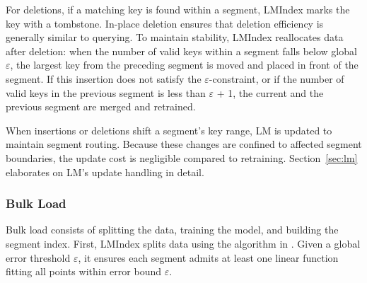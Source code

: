 For deletions, if a matching key is found within a segment, LMIndex marks the key with a tombstone. In-place deletion ensures that deletion efficiency is generally similar to querying. To maintain stability, LMIndex reallocates data after deletion: when the number of valid keys within a segment falls below global $\varepsilon$, the largest key from the preceding segment is moved and placed in front of the segment. If this insertion does not satisfy the $\varepsilon$-constraint, or if the number of valid keys in the previous segment is less than $\varepsilon$ + 1, the current and the previous segment are merged and retrained.


When insertions or deletions shift a segment’s key range, LM is updated to maintain segment routing. Because these changes are confined to affected segment boundaries, the update cost is negligible compared to retraining. Section~\ref{sec:lm} elaborates on LM’s update handling in detail.

\subsubsection{Bulk Load}

Bulk load consists of splitting the data, training the model, and building the segment index. First, LMIndex splits data using the algorithm in \cite{pgm20}. Given a global error threshold $\varepsilon$, it ensures each segment admits at least one linear function fitting all points within error bound $\varepsilon$.


